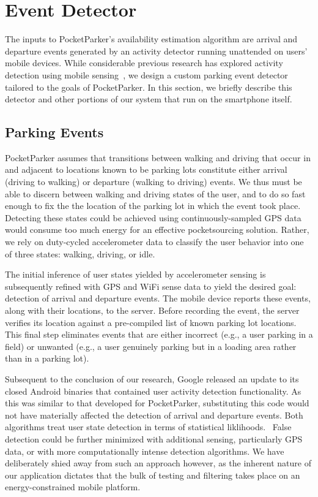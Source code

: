\section{Event Detector}
\label{sec-detector}

The inputs to PocketParker's availability estimation algorithm are arrival and
departure events generated by an activity detector running unattended on users'
mobile devices.  While considerable previous research has explored activity
detection using mobile sensing~\cite{Constandache:2010:DYS, Keally:2011:PTP,
Reddy:2010:UMP, Yang:2011:DDP, Wang:2009:FEE}, we design a custom parking event
detector tailored to the goals of PocketParker.  In this section, we briefly
describe this detector and other portions of our system that run on the
smartphone itself.  

\subsection{Parking Events}
\label{subsec-goals}

PocketParker assumes that transitions between walking and driving that occur
in and adjacent to locations known to be parking lots constitute either
arrival (driving to walking) or departure (walking to driving) events.  We thus
must be able to discern between walking and driving states of the user, and to 
do so fast enough to fix the the location of the parking lot in which the
event took place.  Detecting these states could be achieved using
continuously-sampled GPS data would consume too much energy for an effective
pocketsourcing solution.  Rather, we rely on duty-cycled accelerometer data to
classify the user behavior into one of three states: walking, driving, or idle.

The initial inference of user states yielded by accelerometer sensing is
subsequently refined with GPS and WiFi sense data to yield the desired goal:
detection of arrival and departure events.  The mobile device reports these
events, along with their locations, to the server.  Before recording the event,
the server verifies its location against a pre-compiled list of known parking
lot locations.  This final step eliminates events that are either
incorrect (e.g., a user parking in a field) or unwanted (e.g., a user genuinely
parking but in a loading area rather than in a parking lot).

Subsequent to the conclusion of our research, Google released an update to its
closed Android binaries that contained user activity detection functionality.
As this was similar to that developed for PocketParker, substituting this
code would not have materially affected the detection of arrival and departure 
events.  Both algorithms treat user state detection in terms of statistical
liklihoods.~\cite{website}  False detection could be further minimized with
additional sensing, particularly GPS data, or with more computationally intense
detection algorithms.  We have deliberately shied away from such an approach
however, as the inherent nature of our application dictates that the bulk of
testing and filtering takes place on an energy-constrained mobile platform.
